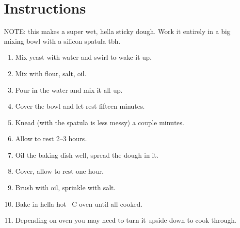 \documentclass[main.tex]{subfiles}
\begin{document}
\section{Instructions}

NOTE: this makes a super wet, hella sticky dough. Work it entirely in a big mixing bowl with a silicon spatula tbh.
\begin{enumerate}
    \item Mix yeast with water and swirl to wake it up.
    \item Mix with flour, salt, oil.
    \item Pour in the water and mix it all up.
    \item Cover the bowl and let rest fifteen minutes.
    \item Knead (with the spatula is less messy) a couple minutes.
    \item Allow to rest 2--3 hours.
    \item Oil the baking dish well, spread the dough in it.
    \item Cover, allow to rest one hour.
    \item Brush with oil, sprinkle with salt.
    \item Bake in hella hot \unit[220--250]{\textdegree C} oven until all cooked.
    \item Depending on oven you may need to turn it upside down to cook through.
\end{enumerate}


\end{document}

